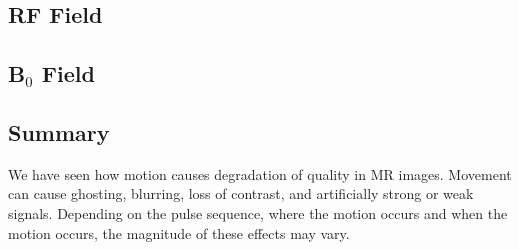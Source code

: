 \documentclass[class=article, crop=false]{standalone}
\begin{document}
\subsection{RF Field}

\subsection{B$_0$ Field}


\subsection{Summary}
We have seen how motion causes degradation of quality in MR images. Movement can cause ghosting, blurring, loss of contrast, and artificially strong or weak signals. Depending on the pulse sequence, where the motion occurs and when the motion occurs, the magnitude of these effects may vary.
\end{document}
